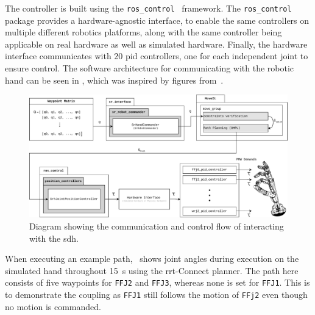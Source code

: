 The controller is built using the \texttt{ros\_control}~\cite{ros-control} framework. The \texttt{ros\_control} package provides a hardware-agnostic interface, to enable the same controllers on multiple different robotics platforms, along with the same controller being applicable on real hardware as well as simulated hardware. Finally, the hardware interface communicates with \num{20} \gls{pid} controllers, one for each independent joint to ensure control. The software architecture for communicating with the robotic hand can be seen in , which was inspired by figures from~\cite{shadow-robotics-control-description,shadow-robotics-firmware,shadow-robotics-controlling-the-hand}.
\begin{figure}[!h]
		\begin{center}
			\includegraphics[width=\textwidth]{chapters/system-setup/fig/system-communication-scheme.pdf}
		\end{center}
		\caption{Diagram showing the communication and control flow of interacting with the \gls{sdh}.}
		\label{fig:hand-communication-architecture}
\end{figure}

When executing an example path,~ shows joint angles during execution on the simulated hand throughout \SI{15}{\second} using the \gls{rrt}-Connect planner. The path here consists of five waypoints for \texttt{FFJ2} and \texttt{FFJ3}, whereas none is set for \texttt{FFJ1}. This is to demonstrate the coupling as \texttt{FFJ1} still follows the motion of \texttt{FFj2} even though no motion is commanded. \medskip

